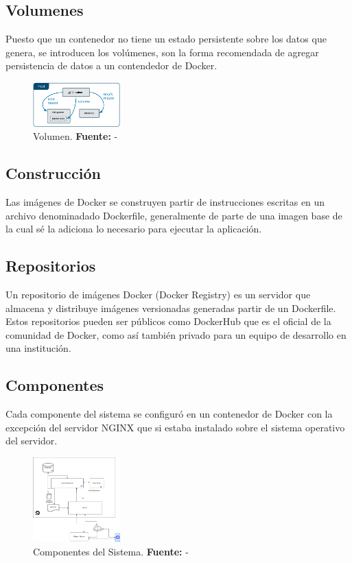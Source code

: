 \subsection{Volumenes}
Puesto que un contenedor no tiene un estado persistente sobre los datos que genera, se introducen
los volúmenes, son la forma recomendada de agregar persistencia de datos a un contendedor de Docker. \cite{Docker}
\begin{figure}[H]
\begin{centering}
\includegraphics[angle=0,width=0.3\textwidth]{Figuras/docker-volume.png}
\par \end{centering}
\caption[Volumen]{Volumen. \textbf{Fuente:} -}
\label{Volumen}
\end{figure}

\subsection{Construcción}
Las imágenes de Docker se construyen partir de instrucciones escritas en un archivo denominadado Dockerfile, generalmente de parte de una imagen base de la cual sé la adiciona lo necesario para ejecutar la aplicación.
\cite{Docker}

\subsection{Repositorios}
Un repositorio de imágenes Docker (Docker Registry) es un servidor que almacena y distribuye imágenes versionadas generadas partir de un Dockerfile. Estos repositorios pueden ser públicos como
DockerHub que es el oficial de la comunidad de Docker, como así también privado para un equipo de
desarrollo en una institución. \cite{Docker}

\subsection{Componentes}
Cada componente del sistema se configuró en un contenedor de Docker con la excepción del servidor NGINX que si estaba instalado sobre el sistema operativo del servidor. 
\begin{figure}[H]
\begin{centering}
\includegraphics[angle=0,width=0.3\textwidth]{Figuras/server.png}
\par \end{centering}
\caption[Componentes del Sistema]{Componentes del Sistema. \textbf{Fuente:} -}
\label{Componentes}
\end{figure}
